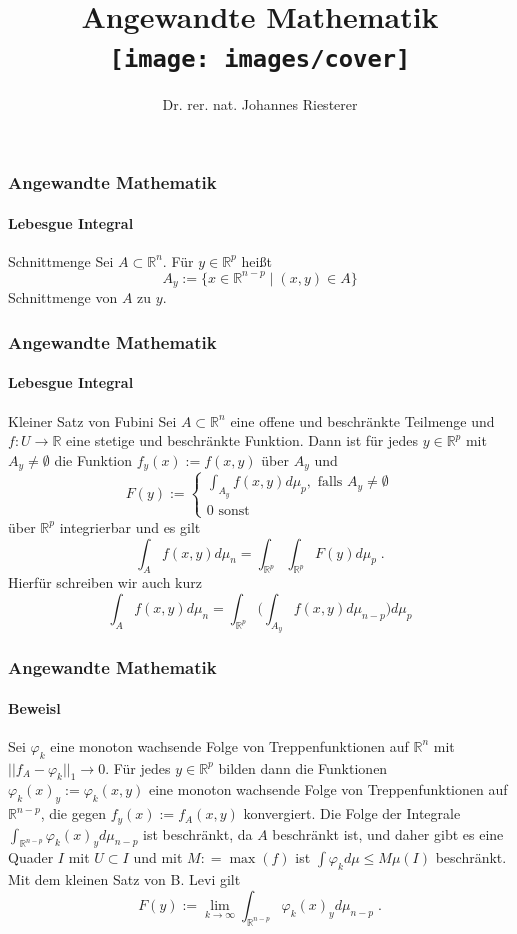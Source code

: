 \documentclass{beamer}
\begin{document}
\title[Angewandte Mathematik] %
{Angewandte Mathematik
\\
\texttt{[image: images/cover]}
}
\subtitle{}
\author[Dr. Johannes Riesterer] %
{Dr.  rer. nat. Johannes Riesterer}

\date[KPT 2004] %
{}

\subject{Angewandte Mathematik}



\frame{\titlepage}



\begin{frame}
    \frametitle{Angewandte Mathematik}
\framesubtitle{Lebesgue Integral}
\begin{block}{Schnittmenge}
Sei $ A \subset \mathbb{R}^n$. Für $ y \in \mathbb{R}^p$ heißt
$$ A_y :=  \biggl \{    x \in \mathbb{R}^{n-p}  \; | \;  (x,y) \in A \biggr \}$$  
Schnittmenge von $A$ zu $y$.
\end{block}
 \end{frame}



\begin{frame}
    \frametitle{Angewandte Mathematik}
\framesubtitle{Lebesgue Integral}
\begin{block}{Kleiner Satz von Fubini}
Sei $A \subset \mathbb{R}^n$ eine offene und beschränkte Teilmenge und $f : U \to \mathbb{R}$  eine stetige und beschränkte Funktion.
Dann ist für jedes $ y \in \mathbb{R}^p$ mit $A_y \neq \emptyset$ die Funktion $f_y(x) := f(x,y)$ über $A_y$ und   
$$ F(y) := \begin{cases}   \int_{A_y} f(x,y) d \mu_{p}  , \text{ falls }  A_y \neq \emptyset 
\\ 0 \text{ sonst } \end{cases} $$
über $\mathbb{R}^{p}$ integrierbar und es gilt 
$$ \int_A f(x,y) d \mu_n = \int_{\mathbb{R}^p}  \int_{\mathbb{R}^p } F(y) d \mu_p \; .$$
 Hierfür schreiben wir auch kurz
$$ \int_A f(x,y) d \mu_n  = \int_{\mathbb{R}^{p} }  \biggl ( \int_{A_y} f(x,y)  d\mu_{n-p} \biggr ) d\mu_p$$
\end{block}
 \end{frame}



\begin{frame}
    \frametitle{Angewandte Mathematik}
\framesubtitle{Beweisl}
Sei  $\varphi_k$ eine monoton wachsende Folge von Treppenfunktionen auf $\mathbb{R}^n$ mit $|| f_A - \varphi_k ||_1 \to 0$.
Für jedes $y \in \mathbb{R}^p$ bilden dann die Funktionen $\varphi_k(x)_y := \varphi_k(x,y)$ eine monoton wachsende Folge von Treppenfunktionen auf $\mathbb{R}^{n-p}$, die gegen $f_y(x):= f_A(x,y)$ konvergiert. Die Folge der Integrale $\int_{\mathbb{R}^{n-p}} \varphi_k(x)_y d \mu_{n-p}$ ist beschränkt,  da $A$ beschränkt ist, und daher gibt es eine Quader $I$ mit $U \subset I$ und  mit $M : = \max (f)$  ist $\int \varphi_k d \mu \leq M \mu(I)$ beschränkt. Mit dem kleinen Satz von B. Levi
gilt
$$ F(y) := \lim_{k \to \infty} \int_{\mathbb{R}^{n-p}} \varphi_k(x)_y d \mu_{n-p} \; .$$
 \end{frame}
\end{document}
